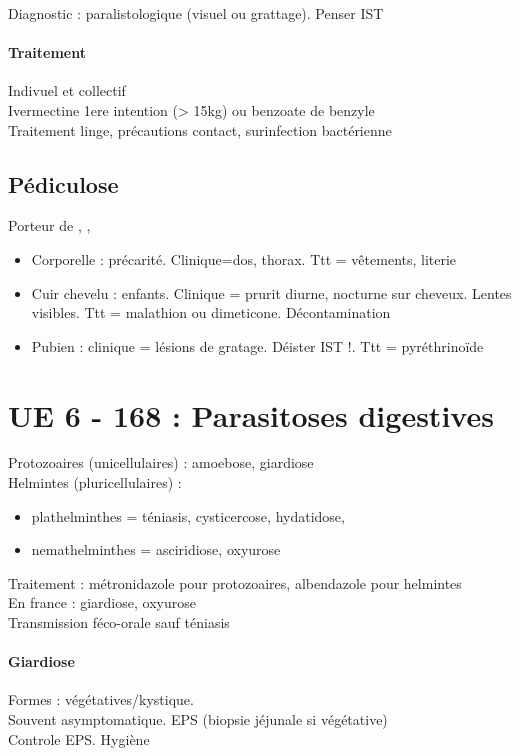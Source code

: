 Diagnostic : paralistologique (visuel ou grattage). Penser IST

\paragraph{Traitement} 
Indivuel et collectif\\
Ivermectine 1ere intention (> 15kg) ou benzoate de benzyle\\
Traitement linge, précautions contact, surinfection bactérienne

\subsection{Pédiculose}
Porteur de , , 

\begin{itemize}
  \item Corporelle : précarité. Clinique=dos, thorax. Ttt = vêtements, literie
    \item Cuir chevelu : enfants. Clinique = prurit diurne, nocturne sur
      cheveux. Lentes visibles. Ttt = malathion ou dimeticone. Décontamination
      \item Pubien : clinique = lésions de gratage. Déister IST !. Ttt = pyréthrinoïde
\end{itemize}

\section{UE 6 - 168 : Parasitoses digestives}
Protozoaires (unicellulaires) : amoebose, giardiose\\
Helmintes (pluricellulaires) : 
\begin{itemize}
  \item plathelminthes = téniasis, cysticercose, hydatidose, 
  \item nemathelminthes = asciridiose, oxyurose
\end{itemize}
Traitement : métronidazole pour protozoaires, albendazole pour helmintes\\
En france : giardiose, oxyurose\\
Transmission féco-orale sauf téniasis

\paragraph{Giardiose} Formes : végétatives/kystique. \\
Souvent asymptomatique. EPS (biopsie jéjunale si végétative)\\
Controle EPS. Hygiène

